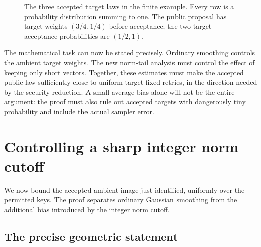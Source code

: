 \documentclass[11pt,a4paper]{article}
\theoremstyle{definition}
\theoremstyle{remark}
\numberwithin{equation}{section}
\begin{document}
\begin{figure}[htbp]
\centering
{}
\caption{The three accepted target laws in the finite example. Every row is a probability distribution summing to one. The public proposal has target weights $(3/4,1/4)$ before acceptance; the two target acceptance probabilities are $(1/2,1)$.}
\label{fig:three-laws}
\end{figure}

The mathematical task can now be stated precisely. Ordinary smoothing
controls the ambient target weights. The new norm-tail analysis must control
the effect of keeping only short vectors. Together, these estimates must make
the accepted public law sufficiently close to uniform-target fixed retries,
in the direction needed by the security reduction. A small average bias alone
will not be the entire argument: the proof must also rule out accepted targets
with dangerously tiny probability and include the actual sampler error.


\section{Controlling a sharp integer norm cutoff}
\label{sec:norm}

We now bound the accepted ambient image just identified, uniformly over the
permitted keys. The proof separates ordinary Gaussian smoothing from the
additional bias introduced by the integer norm cutoff.

\subsection{The precise geometric statement}
\end{document}
